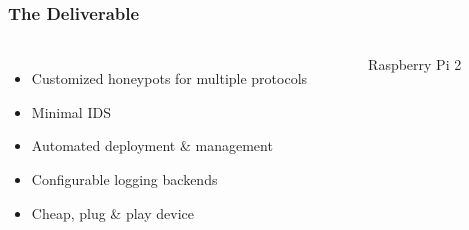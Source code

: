 \begin{frame}
\frametitle{The Deliverable}

\begin{columns}
\begin{itemize}
    \item Customized honeypots for multiple protocols
    \item Minimal IDS
    \item Automated deployment \& management
    \item Configurable logging backends
    \item Cheap, plug \& play device
\end{itemize}
\begin{figure}[pi]
\caption*{Raspberry Pi 2}
\end{figure}
\end{columns}
\end{frame}
